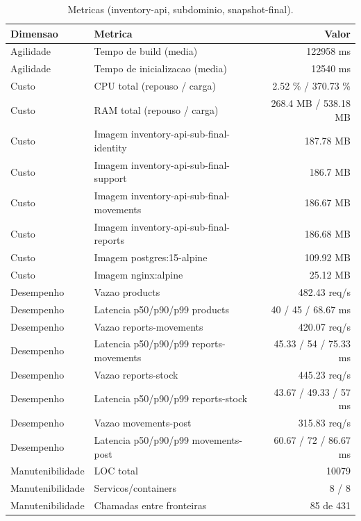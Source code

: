 \begin{table}[htb]
  \centering
  \caption{Metricas (inventory-api, subdominio, snapshot-final).}
  \label{tab:metricas-inventory-api-subdominio-snapshot-final}
  \begin{tabular}{llr}
    \hline
    \textbf{Dimensao} & \textbf{Metrica} & \textbf{Valor} \\
    \hline
    Agilidade & Tempo de build (media) & 122958 ms \\
    Agilidade & Tempo de inicializacao (media) & 12540 ms \\
    Custo & CPU total (repouso / carga) & 2.52 \% / 370.73 \% \\
    Custo & RAM total (repouso / carga) & 268.4 MB / 538.18 MB \\
    Custo & Imagem inventory-api-sub-final-identity & 187.78 MB \\
    Custo & Imagem inventory-api-sub-final-support & 186.7 MB \\
    Custo & Imagem inventory-api-sub-final-movements & 186.67 MB \\
    Custo & Imagem inventory-api-sub-final-reports & 186.68 MB \\
    Custo & Imagem postgres:15-alpine & 109.92 MB \\
    Custo & Imagem nginx:alpine & 25.12 MB \\
    Desempenho & Vazao products & 482.43 req/s \\
    Desempenho & Latencia p50/p90/p99 products & 40 / 45 / 68.67 ms \\
    Desempenho & Vazao reports-movements & 420.07 req/s \\
    Desempenho & Latencia p50/p90/p99 reports-movements & 45.33 / 54 / 75.33 ms \\
    Desempenho & Vazao reports-stock & 445.23 req/s \\
    Desempenho & Latencia p50/p90/p99 reports-stock & 43.67 / 49.33 / 57 ms \\
    Desempenho & Vazao movements-post & 315.83 req/s \\
    Desempenho & Latencia p50/p90/p99 movements-post & 60.67 / 72 / 86.67 ms \\
    Manutenibilidade & LOC total & 10079 \\
    Manutenibilidade & Servicos/containers & 8 / 8 \\
    Manutenibilidade & Chamadas entre fronteiras & 85 de 431 \\
    \hline
  \end{tabular}
\end{table}
